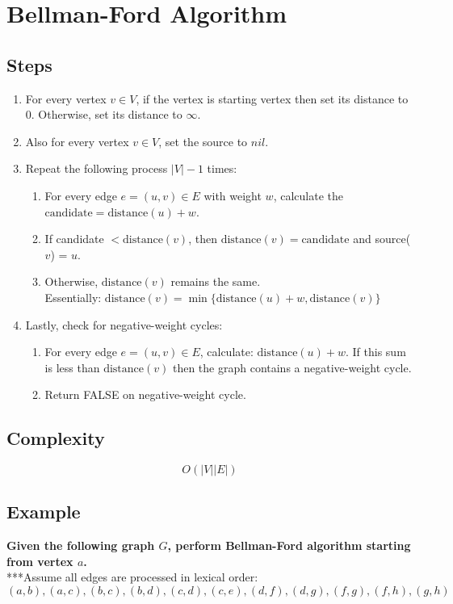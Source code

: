 \section{Bellman-Ford Algorithm}

\subsection*{Steps}
\begin{enumerate}
	\item For every vertex $v \in V$, if the vertex is starting vertex then set its distance to 0. Otherwise, set its distance to $\infty$.
	\item Also for every vertex $v \in V$, set the source to $nil$.
	\item Repeat the following process $\vert V \vert - 1$ times:
	\begin{enumerate}
		\item For every edge $e = (u,v) \in E$ with weight $w$, calculate the $\text{candidate} = \text{distance}(u) + w$.
		\item If candidate $< \text{distance}(v)$, then $\text{distance}(v) = \text{candidate}$ and source($v$) = $u$.
		\item Otherwise, $\text{distance}(v)$ remains the same.\\
			Essentially: $\text{distance}(v) = \min\{ \text{distance}(u) + w, \text{distance}(v)   \}$
	\end{enumerate}
	\item Lastly, check for negative-weight cycles:
	\begin{enumerate}
		\item For every edge $e = (u,v) \in E$, calculate: $\text{distance}(u) + w$. If this sum is less than $\text{distance}(v)$ then the graph contains a negative-weight cycle.
		\item Return FALSE on negative-weight cycle.
	\end{enumerate}
\end{enumerate}

\subsection*{Complexity}
$$
O(\vert V \vert \vert E \vert)
$$

\newpage

\subsection{Example}
\textbf{Given the following graph $G$, perform Bellman-Ford algorithm starting from vertex $a$.}\\
***Assume all edges are processed in lexical order: $(a,b), (a,c), (b,c), (b,d), (c,d), (c,e), (d,f), (d,g), (f,g), (f,h), (g,h)$

